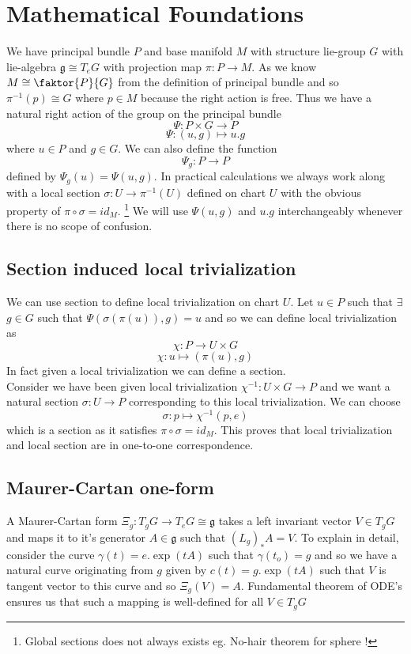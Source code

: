 \documentclass[12pt]{article}
\begin{document}
\section{Mathematical Foundations}
We have principal bundle $P$ and base manifold $M$ with structure lie-group $G$ with lie-algebra $\mathfrak{g} \cong T_{e}G$ with projection map $\pi \colon P \to M$.
As we know $M \cong \faktor{P}{G}$ from the definition of principal bundle and so $\pi^{-1}(p) \cong G $ where $p \in M$ because the right action is free. Thus we have a natural right action of the group  on the principal bundle
\[
\Psi \colon P\times G \to P
\]
\[
\Psi \colon (u, g) \mapsto u.g 
\] where $u \in P$ and $g \in G$. We can also define the function 
\[
\Psi_{g} \colon P \to P
\] defined by $\Psi_{g}(u) = \Psi(u, g)$.
In practical calculations we always work along with a local section $\sigma \colon U \to \pi^{-1}(U)$ defined on chart $U$ with the obvious property of $\pi \circ \sigma = id_{M}$. \footnote{Global sections does not always exists eg. No-hair theorem for sphere !} We will use $\Psi(u, g)$ and $u.g$ interchangeably whenever there is no scope of confusion.

\subsection{Section induced local trivialization}
We can use section to define local trivialization on chart $U$. Let $u \in P$ such that $\exists$ $g \in G$ such that $\Psi(\sigma(\pi(u)), g) = u$ and so we can define local trivialization as
\[
\chi \colon P \to U\times G
\]
\[
\chi \colon u\mapsto (\pi(u), g)
\]
In fact given a local trivialization we can define a section. \\
Consider we have been given local trivialization $\chi^{-1} \colon U \times G \to P$ and we want a natural section $\sigma \colon U \to P$ corresponding to this local trivialization. We can choose
\[
\sigma \colon p \mapsto \chi^{-1}(p, e)
\] which is a section as it satisfies $\pi\circ\sigma = id_{M}$. This proves that local trivialization and local section are in one-to-one correspondence.
\subsection{Maurer-Cartan one-form}
A Maurer-Cartan form $\Xi_{g} \colon T_{g}G \to T_{e}G \cong \mathfrak{g}$ takes a left invariant vector $V \in T_{g}G$ and maps it to it's generator $A \in \mathfrak{g}$ such that $(L_{g})_{\ast}A = V$. To explain in detail, consider the curve $\gamma(t)=e.\exp(tA)$ such that $\gamma(t_{o})=g$ and so we have a natural curve originating from $g$ given by $c(t) = g.\exp(tA)$ such that $V$ is  tangent vector to this curve and so $\Xi_{g}(V) = A $. Fundamental theorem of ODE's ensures us that such a mapping is well-defined for all $V \in T_{g}G$
\end{document}
